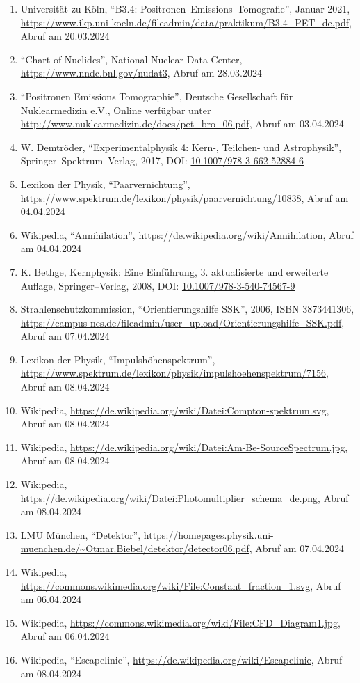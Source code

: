 \documentclass[12pt,a4paper]{scrartcl}
\numberwithin{equation}{section} %
\newcommand{\tightlist}{} %
\begin{document}
\begin{enumerate}
\def\labelenumi{\arabic{enumi}.}
\tightlist
\item
  Universität zu Köln, ``B3.4: Positronen--Emissions--Tomografie'',
  Januar 2021,
  \url{https://www.ikp.uni-koeln.de/fileadmin/data/praktikum/B3.4\_PET\_de.pdf},
  Abruf am 20.03.2024
\item
  ``Chart of Nuclides'', National Nuclear Data Center,
  \url{https://www.nndc.bnl.gov/nudat3}, Abruf am 28.03.2024
\item
  ``Positronen Emissions Tomographie'', Deutsche Gesellschaft für
  Nuklearmedizin e.V., Online verfügbar unter
  \url{http://www.nuklearmedizin.de/docs/pet_bro_06.pdf}, Abruf am
  03.04.2024
\item
  W. Demtröder, ``Experimentalphysik 4: Kern-, Teilchen- und
  Astrophysik'', Springer--Spektrum--Verlag, 2017, DOI:
  \href{https://link.springer.com/book/10.1007/978-3-662-52884-6}{10.1007/978-3-662-52884-6}
\item
  Lexikon der Physik, ``Paarvernichtung'',
  \url{https://www.spektrum.de/lexikon/physik/paarvernichtung/10838},
  Abruf am 04.04.2024
\item
  Wikipedia, ``Annihilation'',
  \url{https://de.wikipedia.org/wiki/Annihilation}, Abruf am 04.04.2024
\item
  K. Bethge, Kernphysik: Eine Einführung, 3. aktualisierte und
  erweiterte Auflage, Springer--Verlag, 2008, DOI:
  \href{https://doi.org/10.1007/978-3-540-74567-9}{10.1007/978-3-540-74567-9}
\item
  Strahlenschutzkommission, ``Orientierungshilfe SSK'', 2006, ISBN 3873441306,
  \url{https://campus-nes.de/fileadmin/user_upload/Orientierungshilfe_SSK.pdf}, Abruf am 07.04.2024
\item
  Lexikon der Physik, ``Impulshöhenspektrum'',
  \url{https://www.spektrum.de/lexikon/physik/impulshoehenspektrum/7156},
  Abruf am 08.04.2024
\item
  Wikipedia,
  \url{https://de.wikipedia.org/wiki/Datei:Compton-spektrum.svg},
  Abruf am 08.04.2024
\item
  Wikipedia,
  \url{https://de.wikipedia.org/wiki/Datei:Am-Be-SourceSpectrum.jpg},
  Abruf am 08.04.2024
\item
  Wikipedia,
  \url{https://de.wikipedia.org/wiki/Datei:Photomultiplier_schema_de.png},
  Abruf am 08.04.2024
\item
  LMU München, ``Detektor'',
  \url{https://homepages.physik.uni-muenchen.de/~Otmar.Biebel/detektor/detector06.pdf},
  Abruf am 07.04.2024
\item
  Wikipedia,
  \url{https://commons.wikimedia.org/wiki/File:Constant_fraction_1.svg},
  Abruf am 06.04.2024
\item
  Wikipedia,
  \url{https://commons.wikimedia.org/wiki/File:CFD_Diagram1.jpg},
  Abruf am 06.04.2024
\item
  Wikipedia, ``Escapelinie'',
  \url{https://de.wikipedia.org/wiki/Escapelinie},
  Abruf am 08.04.2024
\end{enumerate}
\end{document}
